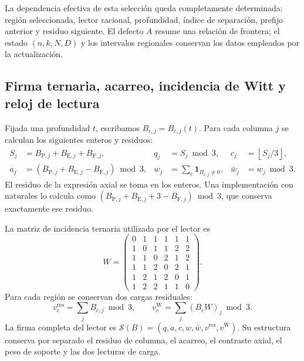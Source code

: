 La dependencia efectiva de esta selección queda completamente determinada:
región seleccionada, lector racional, profundidad, índice de separación,
prefijo anterior y residuo siguiente. El defecto \(A\) resume una relación
de frontera; el estado \((n,k,N,D)\) y los intervalos regionales conservan
los datos empleados por la actualización.

\subsection{Firma ternaria, acarreo, incidencia de Witt y reloj de lectura}
\label{subsec:df-firma-conjunta}


Fijada una profundidad \(t\), escribamos \(B_{c,j}=B_{c,j}(t)\). Para
cada columna \(j\) se calculan los siguientes enteros y residuos:
\begin{align}
 S_j&=B_{\mathrm P,j}+B_{\mathrm E,j}+B_{\mathrm F,j},
 &q_j&=S_j\bmod3,
 &c_j&=\left\lfloor S_j/3\right\rfloor,
 \label{eq:df-firma-qc}\\
 a_j&=(B_{\mathrm P,j}+B_{\mathrm E,j}-B_{\mathrm F,j})\bmod3,
 &w_j&=\sum_c\mathbf1_{B_{c,j}\ne0},
 &\bar w_j&=w_j\bmod3.
 \label{eq:df-firma-axial}
\end{align}
El residuo de la expresión axial se toma en los enteros. Una implementación
con naturales lo calcula como
\((B_{\mathrm P,j}+B_{\mathrm E,j}+3-B_{\mathrm F,j})\bmod3\), que conserva
exactamente ese residuo.

La matriz de incidencia ternaria utilizada por el lector es
\begin{equation}
 W=\begin{pmatrix}
0&1&1&1&1&1\\
1&0&1&1&2&2\\
1&1&0&2&1&2\\
1&1&2&0&2&1\\
1&2&1&2&0&1\\
1&2&2&1&1&0
\end{pmatrix}.
\label{eq:df-matriz-witt}
\end{equation}
Para cada región se conservan dos cargas residuales:
\begin{equation}
 v_c^{\mathrm{res}}=\sum_j B_{c,j}\bmod3,
 \qquad
 v_c^{\mathrm W}=\sum_j(B_cW)_j\bmod3.
 \label{eq:df-cargas-residuales}
\end{equation}
La firma completa del lector es
\(\mathcal S(B)=(q,a,c,w,\bar w,v^{\mathrm{res}},v^{\mathrm W})\).
Su estructura conserva por separado el residuo de columna, el acarreo, el
contraste axial, el peso de soporte y las dos lecturas de carga.

